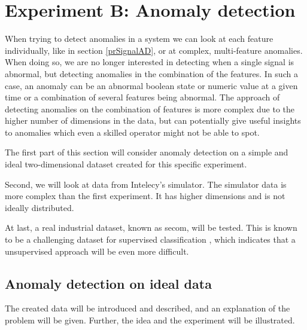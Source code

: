\documentclass[english, a4paper]{report}
\begin{document}
{    \section{Experiment B: Anomaly detection} \label{anomalyDetectionMethod}
    {
        When trying to detect anomalies in a system we can look at each feature individually, like in section \ref{prSignalAD}, or at complex, multi-feature anomalies. When doing so, we are no longer interested in detecting when a single signal is abnormal, but detecting anomalies in the combination of the features. In such a case, an anomaly can be an abnormal boolean state or numeric value at a given time or a combination of several features being abnormal. The approach of detecting anomalies on the combination of features is more complex due to the higher number of dimensions in the data, but can potentially give useful insights to anomalies which even a skilled operator might not be able to spot. 
        \par
        The first part of this section will consider anomaly detection on a simple and ideal two-dimensional dataset created for this specific experiment. 
        \par
        Second, we will look at data from Intelecy's simulator. The simulator data is more complex than the first experiment. It has higher dimensions and is not ideally distributed.
        \par
        At last, a real industrial dataset, known as \gls{secom}, will be tested. This is known to be a challenging dataset for supervised classification \cite{supervisedMLsecom}, which indicates that a unsupervised approach will be even more difficult.
        
        \subsection{Anomaly detection on ideal data} \label{fakeAD}
        {
            The created data will be introduced and described, and an explanation of the problem will be given. Further, the idea and the experiment will be illustrated.
            
}}}
\end{document}
